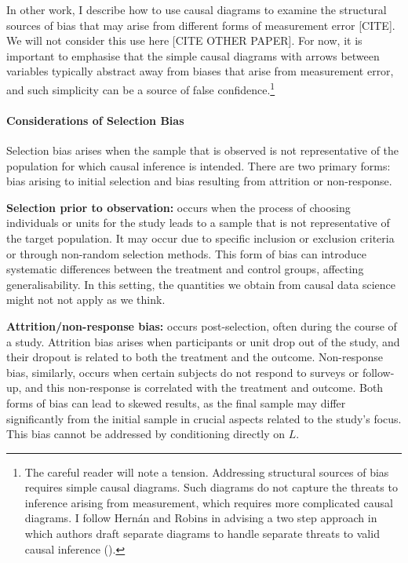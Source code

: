 \documentclass[
  singlecolumn,
  9pt]{article}
\let\oldparagraph\paragraph
\renewcommand{\paragraph}[1]{\oldparagraph{#1}\mbox{}}
\begin{document}
In other work, I describe how to use causal diagrams to examine the
structural sources of bias that may arise from different forms of
measurement error {[}CITE{]}. We will not consider this use here {[}CITE
OTHER PAPER{]}. For now, it is important to emphasise that the simple
causal diagrams with arrows between variables typically abstract away
from biases that arise from measurement error, and such simplicity can
be a source of false confidence.\footnote{The careful reader will note a
  tension. Addressing structural sources of bias requires simple causal
  diagrams. Such diagrams do not capture the threats to inference
  arising from measurement, which requires more complicated causal
  diagrams. I follow Hernán and Robins in advising a two step approach
  in which authors draft separate diagrams to handle separate threats to
  valid causal inference ().}

\paragraph{Considerations of Selection
Bias}\label{considerations-of-selection-bias}

Selection bias arises when the sample that is observed is not
representative of the population for which causal inference is intended.
There are two primary forms: bias arising to initial selection and bias
resulting from attrition or non-response.

\textbf{Selection prior to observation:} occurs when the process of
choosing individuals or units for the study leads to a sample that is
not representative of the target population. It may occur due to
specific inclusion or exclusion criteria or through non-random selection
methods. This form of bias can introduce systematic differences between
the treatment and control groups, affecting generalisability. In this
setting, the quantities we obtain from causal data science might not not
apply as we think.

\textbf{Attrition/non-response bias:} occurs post-selection, often
during the course of a study. Attrition bias arises when participants or
unit drop out of the study, and their dropout is related to both the
treatment and the outcome. Non-response bias, similarly, occurs when
certain subjects do not respond to surveys or follow-up, and this
non-response is correlated with the treatment and outcome. Both forms of
bias can lead to skewed results, as the final sample may differ
significantly from the initial sample in crucial aspects related to the
study's focus. This bias cannot be addressed by conditioning directly on
\(L\).
\end{document}
